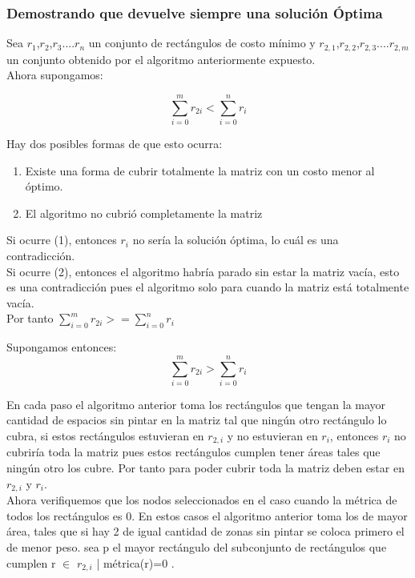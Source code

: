 \documentclass{article}
\begin{document}
    \subsubsection{Demostrando que devuelve siempre una solución Óptima}
 
    Sea {$r_1$,$r_2$,$r_3$....$r_n$} un conjunto de rectángulos de costo mínimo y {$r_{2,1}$,$r_{2,2}$,$r_{2,3}$....$r_{2,m}$} un conjunto obtenido por el algoritmo anteriormente expuesto.\\

    Ahora supongamos:

    \begin{equation}
\sum_{i=0}^{m} r_{2i} < \sum_{i=0}^{n} r_{i}
\end{equation}

Hay dos posibles formas de que esto ocurra:

\begin{enumerate}
    \item Existe una forma de cubrir totalmente la matriz con un costo menor al óptimo.
    \item El algoritmo no cubrió completamente la matriz 
\end{enumerate}

    Si ocurre (1), entonces $r_i$ no sería la solución óptima, lo cuál es una contradicción.\\

    Si ocurre (2), entonces el algoritmo habría parado sin estar la matriz vacía, esto es una contradicción pues el algoritmo solo para cuando la matriz está totalmente vacía.\\

    Por tanto $\sum_{i=0}^{m} r_{2i} >= \sum_{i=0}^{n} r_{i}$


    Supongamos entonces:
 \begin{equation}
\sum_{i=0}^{m} r_{2i} > \sum_{i=0}^{n} r_{i}
\end{equation}

En cada paso el algoritmo anterior toma los rectángulos que tengan la mayor cantidad de espacios sin pintar en la matriz tal que ningún otro rectángulo lo cubra, si estos rectángulos estuvieran en $r_{2,i}$ y no estuvieran en $r_i$, entonces $r_i$ no cubriría toda la matriz pues estos rectángulos cumplen tener áreas tales que ningún otro los cubre. Por tanto para poder cubrir toda la matriz deben estar en $r_{2,i}$ y $r_i$.\\

Ahora verifiquemos que los nodos seleccionados en el caso cuando la métrica de todos los rectángulos es 0. En estos casos el algoritmo anterior toma los de mayor área, tales que si hay 2 de igual cantidad de zonas sin pintar se coloca primero el de menor peso. sea p el mayor rectángulo del subconjunto de rectángulos que cumplen { r $\in$ $r_{2,i}$ | métrica(r)=0 }.\\
\end{document}
